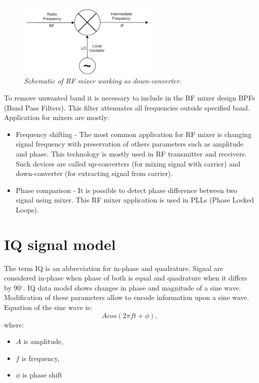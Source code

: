\documentclass[en,printmode]{mgr}
\begin{document}
		\begin{figure}[!htb]
    		\centering
   			\includegraphics[width=0.6\textwidth]{diag/downmx.png}
    		\caption{\textit{Schematic of RF mixer working as down-converter.}}
		\end{figure}
		
		To remove unwanted band it is necessary to include in the RF mixer design BPFs (Band Pass Filters).
		This filter attenuates all frequencies outside specified band.
		\\
		
		Application for mixers are mostly:
		\begin{itemize}
			\item Frequency shifting - The most common application for RF mixer is changing signal frequency
			with preservation of others parameters such as amplitude and phase.
			This technology is mostly used in RF transmitter and receivers.
			Such devices are called up-converters (for mixing signal with carrier) and down-converter (for
			extracting signal from carrier).
			\item Phase comparison - It is possible to detect phase difference between two signal using mixer.
			This RF mixer application is used in PLLs (Phase Locked Loops).
		\end{itemize}
	
	\section{IQ signal model}
			The term IQ is an abbreviation for in-phase and quadrature. Signal are considered in-phase when phase
		of both is equal and quadrature when it differs by 90$^{\circ}$. IQ data model shows changes in phase and
		magnitude of a sine wave. Modification of these parameters allow to encode information upon a sine wave.
		\\
		
		\noindent				
		Equation of the sine wave is:
		\[
			A cos\left(2\pi f t+ \phi\right), \label{eq:sinewave}
		\]
		where:
		\begin{itemize}
			\item $A$ is amplitude,
			\item $f$ is frequency,
			\item $\phi$ is phase shift
		\end{itemize}
		
\end{document}
